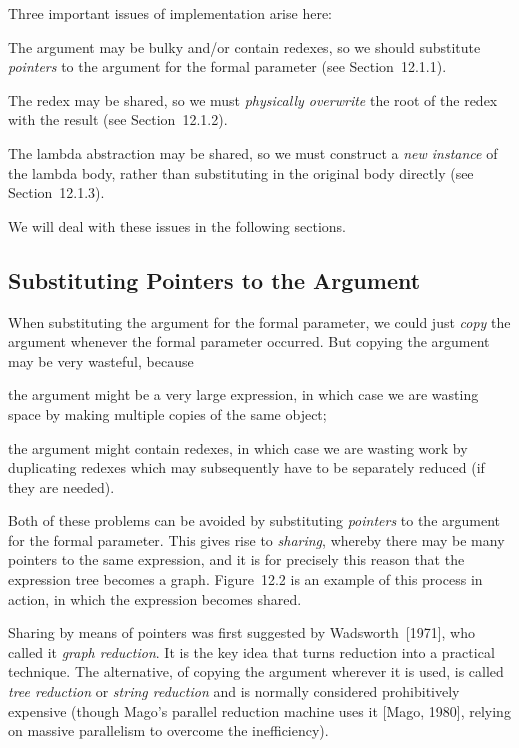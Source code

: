 Three important issues of implementation arise here:
\begin{numbered}
    \item The argument may be bulky and/or contain redexes, so we should
    substitute \textit{pointers} to the argument for the formal parameter (see Section~12.1.1).

    \item The redex may be shared, so we must \textit{physically overwrite} the root of the
    redex with the result (see Section~12.1.2).

    \item The lambda abstraction may be shared, so we must construct a \textit{new
        instance} of the lambda body, rather than substituting in the original body
    directly (see Section~12.1.3).
\end{numbered}
We will deal with these issues in the following sections.

\subsection{Substituting Pointers to the Argument}

When substituting the argument for the formal parameter, we could just \textit{copy}
the argument whenever the formal parameter occurred. But copying the
argument may be very wasteful, because
\begin{numbered}
    \item the argument might be a very large expression, in which case we are
    wasting space by making multiple copies of the same object;

    \item the argument might contain redexes, in which case we are wasting work by
    duplicating redexes which may subsequently have to be separately
    reduced (if they are needed).
\end{numbered}
Both of these problems can be avoided by substituting \textit{pointers} to the
argument for the formal parameter. This gives rise to \textit{sharing}, whereby there
may be many pointers to the same expression, and it is for precisely this
reason that the expression tree becomes a graph. Figure~12.2 is an example of
this process in action, in which the  expression becomes shared.

Sharing by means of pointers was first suggested by Wadsworth~[1971], who
called it \textit{graph reduction}. It is the key idea that turns reduction into a practical
technique. The alternative, of copying the argument wherever it is used, is
called \textit{tree reduction} or \textit{string reduction} and is normally considered
prohibitively expensive (though Mago's parallel reduction machine uses it
[Mago, 1980], relying on massive parallelism to overcome the inefficiency).

